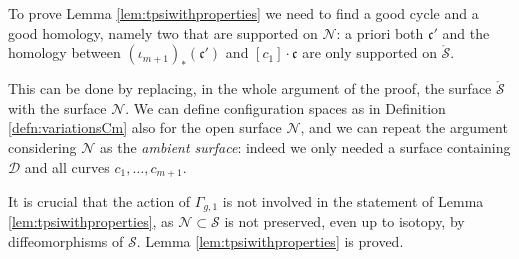 \documentclass{amsart}
\theoremstyle{plain}
\theoremstyle{definition}
\newcommand{\fc}{\mathfrak{c}}
\newcommand{\D}{\mathcal{D}}
\newcommand{\N}{\mathcal{N}}
\renewcommand{\S}{\mathcal{S}}
\renewcommand{\gg}{\Gamma_{g,1}}
\newcommand{\pa}[1]{\left(#1\right)}
\newcommand{\mrS}{\mathring{\S}}
\begin{document}
To prove Lemma \ref{lem:tpsiwithproperties} we need to find a good cycle and
a good homology, namely two that are supported on $\N$: a priori both $\fc'$ and the homology
between $\pa{\iota_{m+1}}_*(\fc')$ and $[c_1]\cdot\fc$ are only supported on $\mrS$.

This can be done by replacing, in the whole argument of the proof, the surface $\mrS$ with the surface $\N$.
We can define configuration spaces as in Definition \ref{defn:variationsCm} also for the open surface
$\N$, and we can repeat the argument considering $\N$ as the \emph{ambient surface}:
indeed we only needed a surface containing $\D$ and all curves $c_1,\dots,c_{m+1}$.

It is crucial that the action of $\gg$ is not involved in the statement of Lemma
\ref{lem:tpsiwithproperties}, as $\N\subset\S$ is not preserved, even up to isotopy,
by diffeomorphisms of $\S$.
Lemma \ref{lem:tpsiwithproperties} is proved.
\end{document}
